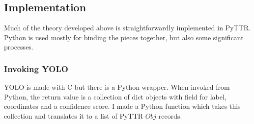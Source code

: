 \documentclass[11pt, a4paper]{article}
\begin{document}
\subsection{Implementation}

Much of the theory developed above is straightforwardly implemented in PyTTR. 
Python is used mostly for binding the pieces together, but also some significant processes.



\subsubsection{Invoking YOLO}

YOLO is made with C but there is a Python wrapper.
When invoked from Python, the return value is a collection of dict objects with field for label, coordinates and a confidence score.
I made a Python function which takes this collection and translates it to a list of PyTTR $Obj$ records.

\end{document}
